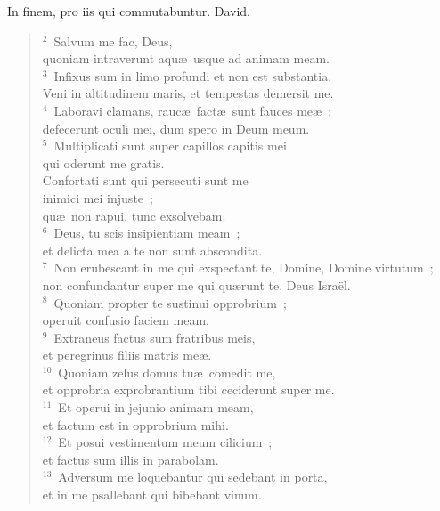 \bchapter
\lettrine[lines=3,image=true,loversize=0.05,lraise=-0.03]{I}{}n finem, pro iis qui commutabuntur. David.
\begin{flushleft}\begin{verse}\vspace{6pt}${}^{2}$~Salvum me fac, Deus,\\ quoniam intraverunt aqu\ae\ usque ad animam meam.\\
${}^{3}$~Infixus sum in limo profundi et non est substantia.\\ Veni in altitudinem maris, et tempestas demersit me.\\
${}^{4}$~Laboravi clamans, rauc\ae\ fact\ae\ sunt fauces me\ae~;\\ defecerunt oculi mei, dum spero in Deum meum.\\
${}^{5}$~Multiplicati sunt super capillos capitis mei\\ qui oderunt me gratis.\\ Confortati sunt qui persecuti sunt me\\ inimici mei injuste~;\\ qu\ae\ non rapui, tunc exsolvebam.\\
${}^{6}$~Deus, tu scis insipientiam meam~;\\ et delicta mea a te non sunt abscondita.\\
${}^{7}$~Non erubescant in me qui exspectant te, Domine, Domine virtutum~;\\ non confundantur super me qui qu\ae runt te, Deus Isra\"el.\\
${}^{8}$~Quoniam propter te sustinui opprobrium~;\\ operuit confusio faciem meam.\\
${}^{9}$~Extraneus factus sum fratribus meis,\\ et peregrinus filiis matris me\ae .\\
${}^{10}$~Quoniam zelus domus tu\ae\ comedit me,\\ et opprobria exprobrantium tibi ceciderunt super me.\\
${}^{11}$~Et operui in jejunio animam meam,\\ et factum est in opprobrium mihi.\\
${}^{12}$~Et posui vestimentum meum cilicium~;\\ et factus sum illis in parabolam.\\
${}^{13}$~Adversum me loquebantur qui sedebant in porta,\\ et in me psallebant qui bibebant vinum.\\

\end{verse}
\end{flushleft}
